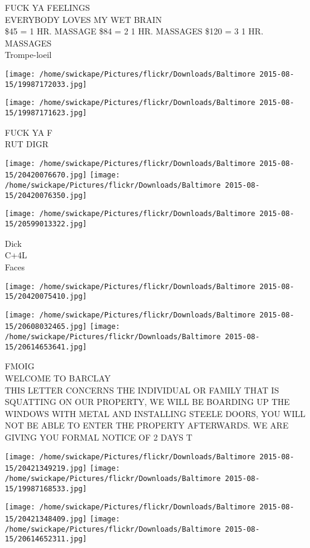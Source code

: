 \documentclass[10pt,letterpaper]{article}
\begin{document}
FUCK YA FEELINGS\\
EVERYBODY LOVES MY WET BRAIN\\
\$45 = 1 HR. MASSAGE \$84 = 2 1 HR. MASSAGES  \$120 = 3 1 HR. MASSAGES\\
Trompe{-}loeil
\pagebreak

\texttt{[image: /home/swickape/Pictures/flickr/Downloads/Baltimore 2015-08-15/19987172033.jpg]}

\vspace{0.25in}
\texttt{[image: /home/swickape/Pictures/flickr/Downloads/Baltimore 2015-08-15/19987171623.jpg]}

FUCK YA F\\
RUT DIGR
\pagebreak

\texttt{[image: /home/swickape/Pictures/flickr/Downloads/Baltimore 2015-08-15/20420076670.jpg]}
\texttt{[image: /home/swickape/Pictures/flickr/Downloads/Baltimore 2015-08-15/20420076350.jpg]}

\texttt{[image: /home/swickape/Pictures/flickr/Downloads/Baltimore 2015-08-15/20599013322.jpg]}

Dick\\
C+4L\\
Faces
\pagebreak

\texttt{[image: /home/swickape/Pictures/flickr/Downloads/Baltimore 2015-08-15/20420075410.jpg]}

\vspace{0.25in}
\texttt{[image: /home/swickape/Pictures/flickr/Downloads/Baltimore 2015-08-15/20608032465.jpg]}
\texttt{[image: /home/swickape/Pictures/flickr/Downloads/Baltimore 2015-08-15/20614653641.jpg]}

FMOIG\\
WELCOME TO BARCLAY\\
THIS LETTER CONCERNS THE INDIVIDUAL OR FAMILY THAT IS SQUATTING ON OUR PROPERTY, WE WILL BE BOARDING UP THE WINDOWS WITH METAL AND INSTALLING STEELE DOORS, YOU WILL NOT BE ABLE TO ENTER THE PROPERTY AFTERWARDS.  WE ARE GIVING YOU FORMAL NOTICE OF 2 DAYS T
\pagebreak

\texttt{[image: /home/swickape/Pictures/flickr/Downloads/Baltimore 2015-08-15/20421349219.jpg]}
\texttt{[image: /home/swickape/Pictures/flickr/Downloads/Baltimore 2015-08-15/19987168533.jpg]}

\texttt{[image: /home/swickape/Pictures/flickr/Downloads/Baltimore 2015-08-15/20421348409.jpg]}
\texttt{[image: /home/swickape/Pictures/flickr/Downloads/Baltimore 2015-08-15/20614652311.jpg]}
\end{document}
